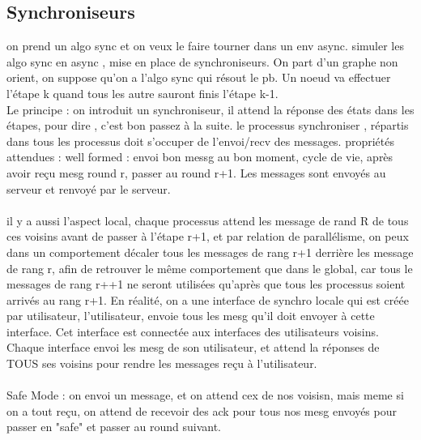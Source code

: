 \documentclass{article}
\begin{document}
\subsection{Synchroniseurs}
on prend un algo sync et on veux le faire tourner dans un env async. simuler les algo sync en async , mise en place de synchroniseurs. On part d'un graphe non orient, on suppose qu'on a l'algo sync qui résout le pb. Un noeud va effectuer l'étape k quand tous les autre sauront finis l'étape k-1.\\Le principe : on introduit un synchroniseur, il attend la réponse des états dans les étapes, pour dire , c'est bon passez à la suite. le processus synchroniser , répartis dans tous les processus doit s'occuper de l'envoi/recv des messages. propriétés attendues : well formed : envoi bon messg au bon moment, cycle de vie, après avoir reçu mesg round r, passer au round r+1. Les messages sont envoyés au serveur et renvoyé par le serveur.\\\\ il y a aussi l'aspect local, chaque processus attend les message de rand R de tous ces voisins avant de passer à l'étape r+1, et par relation de parallélisme, on peux dans un comportement décaler tous les messages de rang r+1 derrière les message de rang r, afin de retrouver le même comportement que dans le global, car tous le messages de rang r++1 ne seront utilisées qu’après que tous les processus soient arrivés au rang r+1. En réalité, on a une interface de synchro locale qui est créée par utilisateur, l'utilisateur, envoie tous les mesg qu'il doit envoyer à cette interface. Cet interface est connectée aux interfaces des utilisateurs voisins. Chaque interface envoi les mesg de son utilisateur, et attend la réponses de TOUS ses voisins pour rendre les messages reçu à l'utilisateur. \\\\Safe Mode : on envoi un message, et on attend cex de nos voisisn,  mais meme si on a tout reçu, on attend de recevoir des ack pour tous nos mesg envoyés pour passer en "safe" et passer au round suivant.
\end{document}
